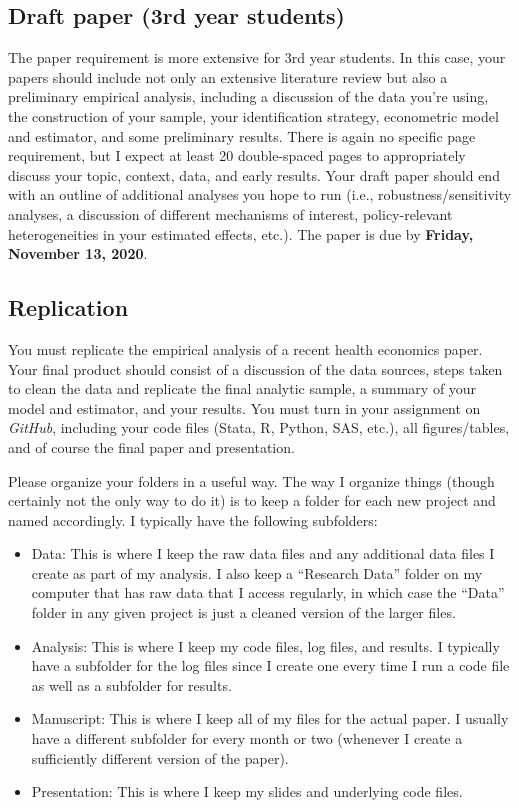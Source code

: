 \documentclass[11pt,]{article}
\begin{document}
\hypertarget{draft-paper-3rd-year-students}{%
\subsection{Draft paper (3rd year
students)}\label{draft-paper-3rd-year-students}}

The paper requirement is more extensive for 3rd year students. In this
case, your papers should include not only an extensive literature review
but also a preliminary empirical analysis, including a discussion of the
data you're using, the construction of your sample, your identification
strategy, econometric model and estimator, and some preliminary results.
There is again no specific page requirement, but I expect at least 20
double-spaced pages to appropriately discuss your topic, context, data,
and early results. Your draft paper should end with an outline of
additional analyses you hope to run (i.e., robustness/sensitivity
analyses, a discussion of different mechanisms of interest,
policy-relevant heterogeneities in your estimated effects, etc.). The
paper is due by \textbf{Friday, November 13, 2020}.

\hypertarget{replication}{%
\subsection{Replication}\label{replication}}

You must replicate the empirical analysis of a recent health economics
paper. Your final product should consist of a discussion of the data
sources, steps taken to clean the data and replicate the final analytic
sample, a summary of your model and estimator, and your results. You
must turn in your assignment on \emph{GitHub}, including your code files
(Stata, R, Python, SAS, etc.), all figures/tables, and of course the
final paper and presentation.

Please organize your folders in a useful way. The way I organize things
(though certainly not the only way to do it) is to keep a folder for
each new project and named accordingly. I typically have the following
subfolders:

\begin{itemize}
\item
  Data: This is where I keep the raw data files and any additional data
  files I create as part of my analysis. I also keep a ``Research Data''
  folder on my computer that has raw data that I access regularly, in
  which case the ``Data'' folder in any given project is just a cleaned
  version of the larger files.
\item
  Analysis: This is where I keep my code files, log files, and results.
  I typically have a subfolder for the log files since I create one
  every time I run a code file as well as a subfolder for results.
\item
  Manuscript: This is where I keep all of my files for the actual paper.
  I usually have a different subfolder for every month or two (whenever
  I create a sufficiently different version of the paper).
\item
  Presentation: This is where I keep my slides and underlying code
  files.
\end{itemize}
\end{document}
